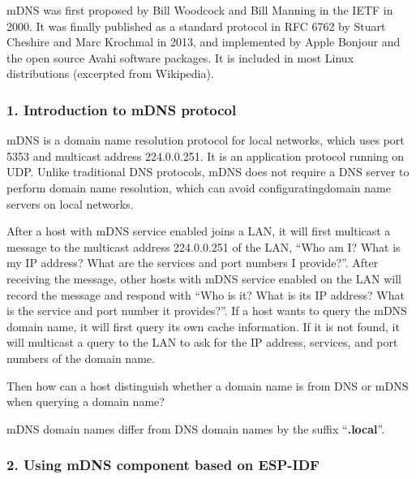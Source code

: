 \documentclass[a4paper,12pt]{book}
\begin{document}
mDNS was first proposed by Bill Woodcock and Bill Manning in the IETF in 2000. It was finally published as a standard protocol in RFC 6762 by Stuart Cheshire and Marc Krochmal in 2013, and implemented by Apple Bonjour and the open source Avahi software packages. It is included in most Linux distributions (excerpted from Wikipedia).

\subsubsection{1. Introduction to mDNS protocol}
mDNS is a domain name resolution protocol for local networks, which uses port 5353 and multicast address 224.0.0.251. It is an application protocol running on UDP. Unlike traditional DNS protocols, mDNS does not require a DNS server to perform domain name resolution, which can avoid configuratingdomain name servers on local networks.

After a host with mDNS service enabled joins a LAN, it will first multicast a message to the multicast address 224.0.0.251 of the LAN, “Who am I? What is my IP address? What are the services and port numbers I provide?”. After receiving the message, other hosts with mDNS service enabled on the LAN will record the message and respond with “Who is it? What is its IP address? What is the service and port number it provides?”. If a host wants to query the mDNS domain name, it will first query its own cache information. If it is not found, it will multicast a query to the LAN to ask for the IP address, services, and port numbers of the domain name.

Then how can a host distinguish whether a domain name is from DNS or mDNS when querying a domain name?

mDNS domain names differ from DNS domain names by the suffix “\textbf{.local}”.

\subsubsection{2. Using mDNS component based on ESP-IDF}
\end{document}
